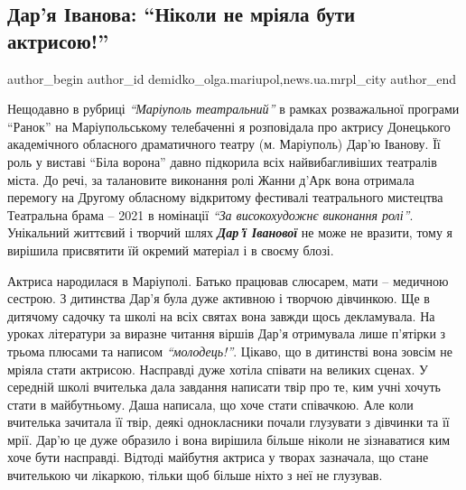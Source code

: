  
 
 
 
 
 
\subsection{Дар'я Іванова: \enquote{Ніколи не мріяла бути актрисою!}}
\label{sec:24_10_2021.stz.news.ua.mrpl_city.1.darja_ivanova}
 
\ifcmt
 author_begin
   author_id demidko_olga.mariupol,news.ua.mrpl_city
 author_end
\fi


Нещодавно в рубриці \emph{\enquote{Маріуполь театральний}} в рамках розважальної програми
\enquote{Ранок} на Маріупольському телебаченні я розповідала про актрису Донецького
академічного обласного драматичного театру (м. Маріуполь) Дар'ю Іванову. Її
роль у виставі \enquote{Біла ворона} давно підкорила всіх найвибагливіших театралів
міста. До речі, за талановите виконання ролі Жанни д'Арк вона отримала перемогу
на Другому обласному відкритому фестивалі театрального мистецтва Театральна
брама – 2021 в номінації \emph{\enquote{За високохудожнє виконання ролі}}. Унікальний життєвий
і творчий шлях \emph{\textbf{Дар'ї Іванової}} не може не вразити, тому я вирішила присвятити їй
окремий матеріал і в своєму блозі.


Актриса народилася в Маріуполі. Батько працював слюсарем, мати – медичною
сестрою. З дитинства Дар'я була дуже активною і творчою дівчинкою. Ще в
дитячому садочку та школі на всіх святах вона завжди щось декламувала. На
уроках літератури за виразне читання віршів Дар'я отримувала лише п'ятірки з
трьома плюсами та написом \emph{\enquote{молодець!}}. Цікаво, що в дитинстві вона зовсім не
мріяла стати актрисою. Насправді дуже хотіла співати на великих сценах. У
середній школі вчителька дала завдання написати твір про те, ким учні хочуть
стати в майбутньому. Даша написала, що хоче стати співачкою. Але коли вчителька
зачитала її твір, деякі однокласники почали глузувати з дівчинки та її мрії.
Дар'ю це дуже образило і вона вирішила більше ніколи не зізнаватися ким хоче
бути насправді. Відтоді майбутня актриса у творах зазначала, що стане
вчителькою чи лікаркою, тільки щоб більше ніхто з неї не глузував.

